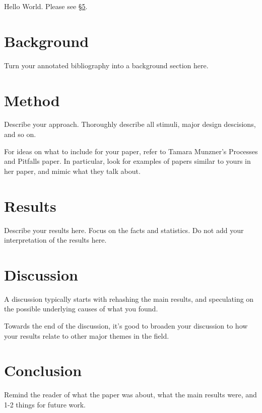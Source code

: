 Hello World. Please see \S\ref{sec:conclusion}.

\testfigure

\testtable

\section{Background}
Turn your annotated bibliography into a background section here.

\section{Method}
Describe your approach. 
Thoroughly describe all stimuli, major design descisions, and so on.

For ideas on what to include for your paper, refer to Tamara Munzner's Processes and Pitfalls paper.
In particular, look for examples of papers similar to yours in her paper, and mimic what they talk about.

\section{Results}
Describe your results here. Focus on the facts and statistics. Do not add your interpretation of the results here.

\section{Discussion}
A discussion typically starts with rehashing the main results, and speculating on the possible underlying causes of what you found.

Towards the end of the discussion, it's good to broaden your discussion to how your results relate to other major themes in the field.

\section{Conclusion}
\label{sec:conclusion}
Remind the reader of what the paper was about, what the main results were, and 1-2 things for future work.
